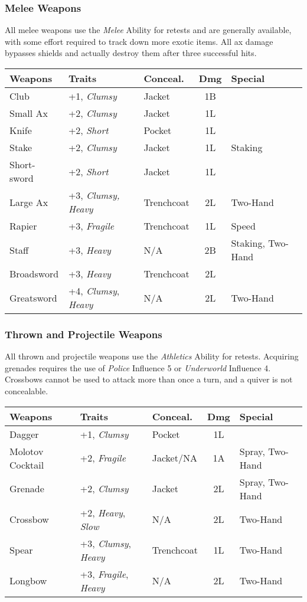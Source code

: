 \subsubsection{Melee Weapons}
All melee weapons use the \emph{Melee} Ability for retests and are generally available, with some 
effort required to track down more exotic items.  All ax damage bypasses shields and actually 
destroy them after three successful hits.  \\

{\footnotesize
\begin{tabular}{ | l l l c l | }
	\hline
	\textbf{Weapons} & \textbf{Traits} & \textbf{Conceal.} & 
	\textbf{Dmg} & \textbf{Special} \\
	\hline
	Club & +1, \emph{Clumsy} & Jacket & 1B & \\
	Small Ax & +2, \emph{Clumsy} & Jacket & 1L & \\
	Knife & +2, \emph{Short} & Pocket & 1L & \\
	Stake & +2, \emph{Clumsy} & Jacket & 1L & Staking \\
	Short-sword & +2, \emph{Short} & Jacket & 1L & \\
	Large Ax & +3, \emph{Clumsy, Heavy} & Trenchcoat & 2L & Two-Hand \\
	Rapier & +3, \emph{Fragile} & Trenchcoat & 1L & Speed \\
	Staff & +3, \emph{Heavy} & N/A & 2B & Staking, Two-Hand \\
	Broadsword & +3, \emph{Heavy} & Trenchcoat & 2L & \\
	Greatsword & +4, \emph{Clumsy}, \emph{Heavy} & N/A & 2L & Two-Hand \\
	\hline
\end{tabular}
}

\subsubsection{Thrown and Projectile Weapons}
All thrown and projectile weapons use the \emph{Athletics} Ability for retests.  Acquiring 
grenades requires the use of \emph{Police} Influence 5 or \emph{Underworld} Influence 4. 
Crossbows cannot be used to attack more than once a turn, and a quiver is not concealable.  \\

{\footnotesize
\begin{tabular}{ | l l l c l | }
	\hline
	\textbf{Weapons} & \textbf{Traits} & \textbf{Conceal.} & 
	\textbf{Dmg} & \textbf{Special} \\
	\hline
	Dagger & +1, \emph{Clumsy} & Pocket & 1L & \\
	Molotov Cocktail & +2, \emph{Fragile} & Jacket/NA & 1A & Spray, Two-Hand \\
	Grenade & +2, \emph{Clumsy} & Jacket & 2L & Spray, Two-Hand \\
	Crossbow & +2, \emph{Heavy}, \emph{Slow} & N/A & 2L & Two-Hand \\
	Spear & +3, \emph{Clumsy}, \emph{Heavy} & Trenchcoat & 1L & Two-Hand \\
	Longbow & +3, \emph{Fragile}, \emph{Heavy} & N/A & 2L & Two-Hand \\
	\hline
\end{tabular}
}

